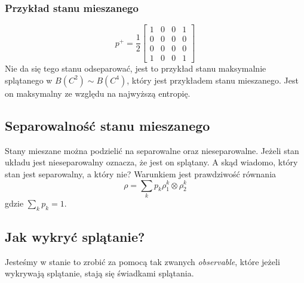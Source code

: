 \documentclass[11pt, a4paper, fleqn]{article}
\begin{document}
        \subsubsection*{Przykład stanu mieszanego}
            \def\Pp{
                \begin{bmatrix}
                    1 & 0 & 0 & 1\\
                    0 & 0 & 0 & 0\\
                    0 & 0 & 0 & 0\\
                    1 & 0 & 0 & 1
                \end{bmatrix}
            }
            \begin{equation}
                p^+ = \frac{1}{2}\Pp
            \end{equation}
            Nie da się tego stanu odseparować, jest to przykład stanu maksymalnie splątanego w $B(C^2) \sim B(C^4)$, który
            jest przykładem stanu mieszanego. Jest on maksymalny ze względu na najwyższą entropię.
            

    \subsection{Separowalność stanu mieszanego}
        Stany mieszane można podzielić na separowalne oraz nieseparowalne. Jeżeli stan układu jest nieseparowalny
        oznacza, że jest on splątany. A skąd wiadomo, który stan jest separowalny, a który nie?
        Warunkiem jest prawdziwość równania
        \begin{equation}
            \rho = \sum_{k}p_k \rho_1^k \otimes \rho_2^k
        \end{equation}
        gdzie $\sum_{k}p_k = 1$.

    \subsection{Jak wykryć splątanie?}
        \def\Ppr{
            \begin{bmatrix}
                1 & 0 & 0 & 0\\
                0 & 0 & 1 & 0\\
                0 & 1 & 0 & 0\\
                0 & 0 & 0 & 1
            \end{bmatrix}
        }
        Jesteśmy w stanie to zrobić za pomocą tak zwanych \textit{observable}, które jeżeli wykrywają splątanie,
        stają się świadkami splątania.
\end{document}
